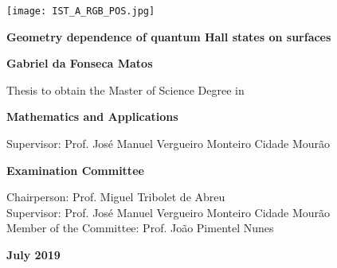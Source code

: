 \documentclass[notas.tex]{subfiles}
\begin{document}
	\begin{titlepage}
		\hspace*{-2.9cm}\texttt{[image: IST\_A\_RGB\_POS.jpg]}\par
		\centering
		{\fontsize{16pt}{24pt}\selectfont\textbf{Geometry dependence of quantum Hall states on surfaces}\par}
		{\fontsize{14pt}{21pt}\selectfont\textbf{Gabriel da Fonseca Matos}\par}
		\vfill
		{\fontsize{12pt}{16pt}\selectfont Thesis to obtain the Master of Science Degree in \par}
		{\fontsize{16pt}{24pt}\selectfont\textbf{Mathematics and Applications}\par}
		\vfill
		{\fontsize{12pt}{16pt}\selectfont Supervisor: Prof. José Manuel Vergueiro Monteiro Cidade Mourão\par}
		\vfill
		{\fontsize{14pt}{21pt}\selectfont\textbf{Examination Committee}\par}
		{\fontsize{12pt}{16pt}\selectfont Chairperson: Prof. Miguel Tribolet de Abreu\\
		Supervisor: Prof. José Manuel Vergueiro Monteiro Cidade Mourão\\
		Member of the Committee: Prof. João Pimentel Nunes\par}
		\vfill
		{\fontsize{14pt}{14pt}\selectfont\textbf{July 2019}\par}
	\end{titlepage}
\end{document}
